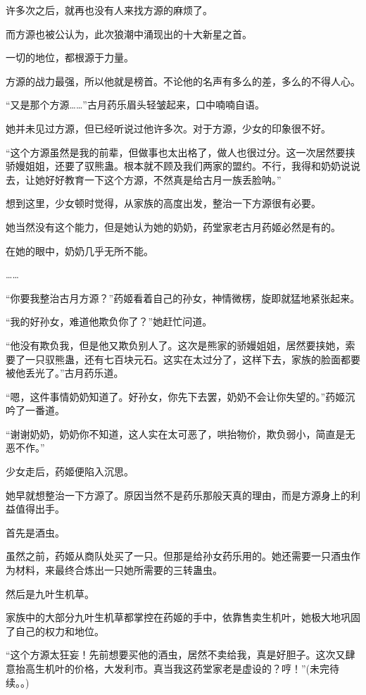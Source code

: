 \begin{this_body}
许多次之后，就再也没有人来找方源的麻烦了。

而方源也被公认为，此次狼潮中涌现出的十大新星之首。

一切的地位，都根源于力量。

方源的战力最强，所以他就是榜首。不论他的名声有多么的差，多么的不得人心。

“又是那个方源……”古月药乐眉头轻皱起来，口中喃喃自语。

她并未见过方源，但已经听说过他许多次。对于方源，少女的印象很不好。

“这个方源虽然是我的前辈，但做事也太出格了，做人也很过分。这一次居然要挟骄嫚姐姐，还要了驭熊蛊。根本就不顾及我们两家的盟约。不行，我得和奶奶说说去，让她好好教育一下这个方源，不然真是给古月一族丢脸呐。”

想到这里，少女顿时觉得，从家族的高度出发，整治一下方源很有必要。

她当然没有这个能力，但是她认为她的奶奶，药堂家老古月药姬必然是有的。

在她的眼中，奶奶几乎无所不能。

……

“你要我整治古月方源？”药姬看着自己的孙女，神情微楞，旋即就猛地紧张起来。

“我的好孙女，难道他欺负你了？”她赶忙问道。

“他没有欺负我，但是他又欺负别人了。这次是熊家的骄嫚姐姐，居然要挟她，索要了一只驭熊蛊，还有七百块元石。这实在太过分了，这样下去，家族的脸面都要被他丢光了。”古月药乐道。

“嗯，这件事情奶奶知道了。好孙女，你先下去罢，奶奶不会让你失望的。”药姬沉吟了一番道。

“谢谢奶奶，奶奶你不知道，这人实在太可恶了，哄抬物价，欺负弱小，简直是无恶不作。”

少女走后，药姬便陷入沉思。

她早就想整治一下方源了。原因当然不是药乐那般天真的理由，而是方源身上的利益值得出手。

首先是酒虫。

虽然之前，药姬从商队处买了一只。但那是给孙女药乐用的。她还需要一只酒虫作为材料，来最终合炼出一只她所需要的三转蛊虫。

然后是九叶生机草。

家族中的大部分九叶生机草都掌控在药姬的手中，依靠售卖生机叶，她极大地巩固了自己的权力和地位。

“这个方源太狂妄！先前想要买他的酒虫，居然不卖给我，真是好胆子。这次又肆意抬高生机叶的价格，大发利市。真当我这药堂家老是虚设的？哼！”(未完待续。。)

\end{this_body}

